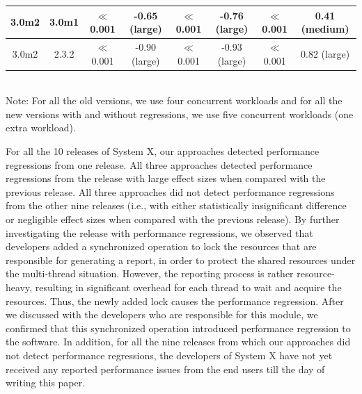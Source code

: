 \begin{table}[tbh]
\begin{tabular}{|c|c|c|c|c|c|c|c|}
    \hline
    3.0m2 & 3.0m1 & $\ll$0.001 & -0.65 (large) & $\ll$0.001 & -0.76 (large) & $\ll$0.001 & 0.41 (medium) \\
    \hline
    3.0m2 & 2.3.2 & $\ll$0.001 & -0.90 (large) &$\ll$0.001 & -0.93 (large) & $\ll$0.001 & 0.82 (large) \\
    \hline
    \end{tabular}\\
    Note: For all the old versions, we use four concurrent workloads and for all the new versions with and without regressions, we use five concurrent workloads (one extra workload).\hfill
  \label{tab:predictionresult_rq2}%
\end{table}%

For all the 10 releases of System X, our approaches detected performance regressions from one release.
All three approaches detected performance regressions from the release with large effect sizes when compared with the previous release.
All three approaches did not detect performance regressions from the other nine releases (i.e., with either statistically insignificant difference or negligible effect sizes when compared with the previous release). 
By further investigating the release with performance regressions, we observed that developers added a synchronized operation to lock the resources that are responsible for generating a report, in order to protect the shared resources under the multi-thread situation. However, the reporting process is rather resource-heavy, resulting in significant overhead for each thread to wait and acquire the resources. Thus, the newly added lock causes the performance regression. After we discussed with the developers who are responsible for this module, we confirmed that this synchronized operation introduced performance regression to the software. 
In addition, for all the nine releases from which our approaches did not detect performance regressions, the developers of System X have not yet received any reported performance issues from the end users till the day of writing this paper.


